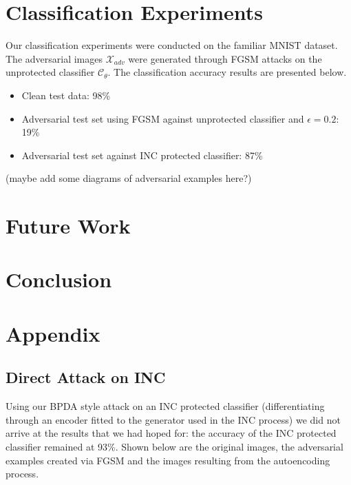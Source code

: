 \documentclass[twoside]{article}
\theoremstyle{definition}
\begin{document}
\section{Classification Experiments}

Our classification experiments were conducted on the familiar MNIST dataset. The adversarial images $\mathcal{X}_{adv}$ were generated through FGSM attacks on the unprotected classifier $\mathcal{C}_{\theta}$. The classification accuracy results
are presented below.

\begin{itemize}
    \item Clean test data: 98\%
    \item Adversarial test set using FGSM against unprotected classifier and $\epsilon = 0.2$: 19\%
    \item Adversarial test set against INC protected classifier: 87\%
\end{itemize}

(maybe add some diagrams of adversarial examples here?)

\section{Future Work}

\section{Conclusion}




\section{Appendix}

\subsection{Direct Attack on INC}

Using our BPDA style attack on an INC protected classifier (differentiating through an encoder fitted to the generator used in the INC process) we did not arrive at the results that we had hoped for: the accuracy of the INC protected classifier remained at 93\%. Shown below are the original images, the adversarial examples created via FGSM and the images resulting from the autoencoding process.
\end{document}
